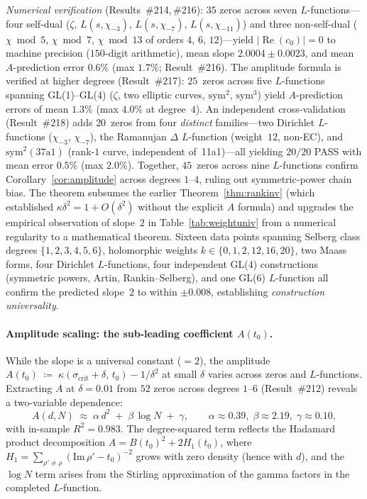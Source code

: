 \documentclass[11pt, a4paper]{article}
\theoremstyle{plain}
\theoremstyle{definition}
\begin{document}
\noindent\textit{Numerical verification} (Results~\#214,\,\#216):
$35$ zeros across seven $L$-functions---four self-dual
($\zeta$, $L(s,\chi_{-3})$, $L(s,\chi_{-7})$, $L(s,\chi_{-11})$)
and three non-self-dual
($\chi\bmod 5$, $\chi\bmod 7$, $\chi\bmod 13$
of orders $4$, $6$, $12$)---yield
$|\operatorname{Re}(c_0)|=0$ to machine precision ($150$-digit arithmetic),
mean slope $2.0004\pm 0.0023$, and mean $A$-prediction error $0.6\%$
(max $1.7\%$; Result~\#216).
The amplitude formula is verified at higher degrees (Result~\#217):
$25$~zeros across five $L$-functions spanning GL(1)--GL(4)
($\zeta$, two elliptic curves, $\mathrm{sym}^{2}$, $\mathrm{sym}^{3}$)
yield $A$-prediction errors of mean $1.3\%$ (max $4.0\%$ at degree~$4$).
An independent cross-validation (Result~\#218) adds $20$~zeros from
four \emph{distinct} families---two Dirichlet $L$-functions ($\chi_{-3}$,
$\chi_{-7}$), the Ramanujan $\Delta$ $L$-function (weight~$12$, non-EC),
and $\mathrm{sym}^{2}(\text{37a1})$ (rank-$1$ curve, independent of~11a1)---all
yielding $20/20$ PASS with mean error $0.5\%$ (max $2.0\%$).
Together, $45$~zeros across nine $L$-functions confirm
Corollary~\ref{cor:amplitude} across degrees $1$--$4$,
ruling out symmetric-power chain bias.
The theorem subsumes the earlier Theorem~\ref{thm:rankinv} (which
established $\kappa\delta^2=1+O(\delta^2)$ without the explicit $A$ formula)
and upgrades the empirical observation of slope~$2$ in Table~\ref{tab:weightuniv}
from a numerical regularity to a mathematical theorem.
Sixteen data points spanning Selberg class degrees $\{1,2,3,4,5,6\}$,
holomorphic weights $k\in\{0,1,2,12,16,20\}$, two Maass forms,
four Dirichlet $L$-functions, four independent GL(4) constructions
(symmetric powers, Artin, Rankin--Selberg), and one GL(6) $L$-function
all confirm the predicted slope~$2$ to within $\pm 0.008$,
establishing \emph{construction universality}.

\paragraph{Amplitude scaling: the sub-leading coefficient $A(t_{0})$.}
While the slope is a universal constant ($=2$), the amplitude
$A(t_{0}) \;\coloneqq\; \kappa(\sigma_{\mathrm{crit}}+\delta,\,t_{0}) - 1/\delta^{2}$
at small $\delta$ varies across zeros and $L$-functions.
Extracting $A$ at $\delta=0.01$ from $52$ zeros across degrees $1$--$6$
(Result~\#212) reveals a two-variable dependence:
\begin{equation}\label{eq:Ascaling}
  A(d,N) \;\approx\; \alpha\,d^{2} \;+\; \beta\,\log N \;+\; \gamma,
  \qquad \alpha\approx 0.39,\;\beta\approx 2.19,\;\gamma\approx 0.10,
\end{equation}
with in-sample $R^{2}=0.983$.  The degree-squared term reflects the
Hadamard product decomposition
$A = B(t_{0})^{2} + 2H_{1}(t_{0})$,
where $H_{1}=\sum_{\rho'\neq\rho}(\mathrm{Im}\,\rho'-t_{0})^{-2}$
grows with zero density (hence with $d$), and the $\log N$ term
arises from the Stirling approximation of the gamma factors in the
completed $L$-function.
\end{document}
